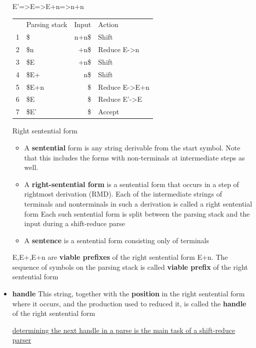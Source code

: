 \documentclass[11pt]{article}
\begin{document}
\begin{itemize}
E'=>E=>E+n=>n+n
\begin{center}
\begin{tabular}{rlrl}
 & Parsing stack & Input & Action\\
1 & \$ & n+n\$ & Shift\\
2 & \$n & +n\$ & Reduce  E->n\\
3 & \$E & +n\$ & Shift\\
4 & \$E+ & n\$ & Shift\\
5 & \$E+n & \$ & Reduce E->E+n\\
6 & \$E & \$ & Reduce E'->E\\
7 & \$E' & \$ & Accept\\
\end{tabular}
\end{center}
\item[{Right sentential form}] \begin{itemize}
\item A \textbf{sentential} form is any string derivable from the start symbol. Note
that this includes the forms with non-terminals at intermediate steps as
well.
\item A \textbf{right-sentential form} is a sentential form that occurs in a step of
rightmost derivation (RMD). 
Each of the intermediate strings of terminals and nonterminals in such
a derivation is called a right sentential form
Each such sentential form is split between the parsing stack and the input
during a shift-reduce parse
\item A \textbf{sentence} is a sentential form consisting only of terminals
\end{itemize}

E,E+,E+n are \textbf{viable prefixes} of the right sentential form E+n.
The sequence of symbols on the parsing stack is called \textbf{viable prefix} of the
right sentential form
\item \textbf{handle}
This string, together with the \textbf{position} in the right sentential form where it
occurs, and the production used to reduced it, is called the \textbf{handle} of the right
sentential form

\uline{determining the next handle in a parse is the main task of a shift-reduce parser}
\end{itemize}
\end{document}
